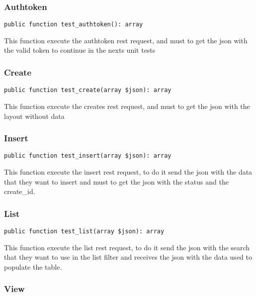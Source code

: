 \documentclass[a4paper]{article}
\begin{document}
\hypertarget{toc396}{}
\subsubsection{Authtoken}

\begin{lstlisting}
public function test_authtoken(): array
\end{lstlisting}

This function execute the authtoken rest request, and must to get the
json with the valid token to continue in the nexts unit tests

\hypertarget{toc397}{}
\subsubsection{Create}

\begin{lstlisting}
public function test_create(array $json): array
\end{lstlisting}

This function execute the creates rest request, and must to get the
json with the layout without data

\hypertarget{toc398}{}
\subsubsection{Insert}

\begin{lstlisting}
public function test_insert(array $json): array
\end{lstlisting}

This function execute the insert rest request, to do it send the json with
the data that they want to insert and must to get the json with the status
and the create\_id.

\hypertarget{toc399}{}
\subsubsection{List}

\begin{lstlisting}
public function test_list(array $json): array
\end{lstlisting}

This function execute the list rest request, to do it send the json with
the search that they want to use in the list filter and receives the json
with the data used to populate the table.

\hypertarget{toc400}{}
\subsubsection{View}
\end{document}
